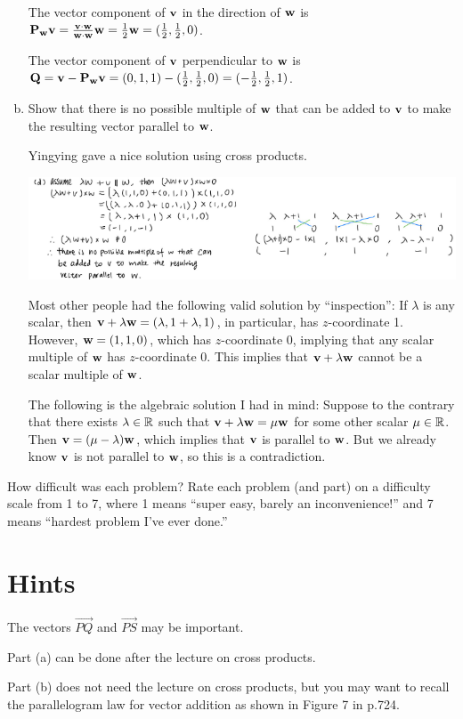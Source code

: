 \begin{problem}
\begin{enumerate}[(a)]
\begin{solution}
      The vector component of $\mathbf v$ in the direction of $\mathbf w$ is $\mathbf P_\mathbf w\mathbf v=\frac{\mathbf v\cdot\mathbf w}{\mathbf w\cdot\mathbf w}\mathbf w=\frac12\mathbf w=(\frac12,\frac12,0)$.

      The vector component of $\mathbf v$ perpendicular to $\mathbf w$ is $\mathbf Q=\mathbf v-\mathbf P_\mathbf w\mathbf v=(0,1,1)-(\frac12,\frac12,0)=(-\frac12,\frac12,1)$.
    \end{solution}
    \item Show that there is no possible multiple of $\mathbf w$ that can be added to $\mathbf v$ to make the resulting vector parallel to $\mathbf w$.
    \begin{solution}
      Yingying gave a nice solution using cross products.
      \begin{center}
        \includegraphics[width=\textwidth]{nice/p1.4c_yingying.png}
      \end{center}
      Most other people had the following valid solution by ``inspection'': If $\lambda$ is any scalar, then $\mathbf v+\lambda\mathbf w=(\lambda,1+\lambda,1)$, in particular, has $z$-coordinate 1. However, $\mathbf w=(1,1,0)$, which has $z$-coordinate 0, implying that any scalar multiple of $\mathbf w$ has $z$-coordinate 0. This implies that $\mathbf v+\lambda\mathbf w$ cannot be a scalar multiple of $\mathbf w$.

      The following is the algebraic solution I had in mind: Suppose to the contrary that there exists $\lambda\in\mathbb R$ such that $\mathbf v+\lambda\mathbf w=\mu\mathbf w$ for some other scalar $\mu\in\mathbb R$. Then $\mathbf v=(\mu-\lambda)\mathbf w$, which implies that $\mathbf v$ is parallel to $\mathbf w$. But we already know $\mathbf v$ is not parallel to $\mathbf w$, so this is a contradiction.
    \end{solution}
  \end{enumerate}
\end{problem}

\begin{problem}
  How difficult was each problem? Rate each problem (and part) on a difficulty scale from 1 to 7, where 1 means ``super easy, barely an inconvenience!'' and 7 means ``hardest problem I've ever done.''
\end{problem}

\newpage

\section{Hints}
\begin{hint}
  The vectors $\overrightarrow{PQ}$ and $\overrightarrow{PS}$ may be important.

  Part (a) can be done after the lecture on cross products.

  Part (b) does not need the lecture on cross products, but you may want to recall the parallelogram law for vector addition as shown in Figure 7 in p.724.
\end{hint}

